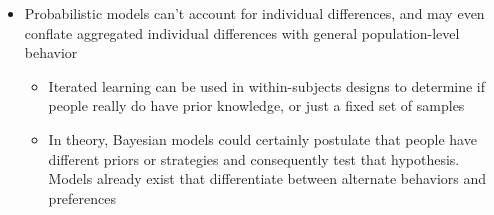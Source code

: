 \documentclass[12pt]{article}
\begin{document}
\begin{itemize}
\item Probabilistic models can't account for individual differences, and may even conflate aggregated individual differences with general population-level behavior \citep{Mozer2008}
    \begin{itemize}
    \item Iterated learning can be used in within-subjects designs to determine if people really do have prior knowledge, or just a fixed set of samples \citep{Lewandowsky2009}
    \item In theory, Bayesian models could certainly postulate that people have different priors or strategies and consequently test that hypothesis. Models already exist that differentiate between alternate behaviors and preferences \citep{Baker2014,Pantelis2014}
    \end{itemize}

\end{itemize}

\end{document}
